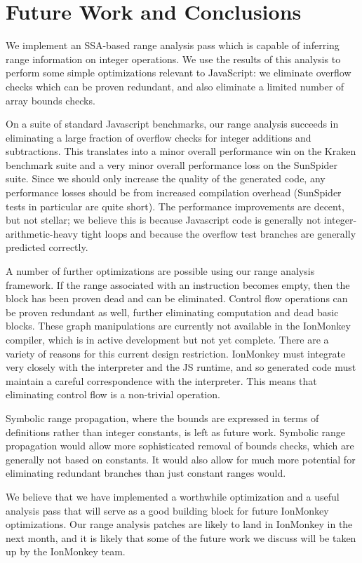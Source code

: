 \documentclass{article}
\begin{document}
\section{Future Work and Conclusions}
We implement an SSA-based range analysis pass which is capable of
inferring range information on integer operations. We use the results
of this analysis to perform some simple optimizations relevant to
JavaScript: we eliminate overflow checks which can be proven
redundant, and also eliminate a limited number of array bounds checks.

On a suite of standard Javascript benchmarks, our range analysis
succeeds in eliminating a large fraction of overflow checks for
integer additions and subtractions. This translates into a minor
overall performance win on the Kraken benchmark suite and a very minor
overall performance loss on the SunSpider suite. Since we should only
increase the quality of the generated code, any performance losses
should be from increased compilation overhead (SunSpider tests in
particular are quite short). The performance improvements are decent,
but not stellar; we believe this is because Javascript code is
generally not integer-arithmetic-heavy tight loops and because the
overflow test branches are generally predicted correctly.

A number of further optimizations are possible using our range analysis
framework. If the range associated with an instruction becomes empty, then the
block has been proven dead and can be eliminated. Control flow operations can
be proven redundant as well, further eliminating computation and dead basic
blocks. These graph manipulations are currently not available in the IonMonkey
compiler, which is in active development but not yet complete. There are a
variety of reasons for this current design restriction. IonMonkey must
integrate very closely with the interpreter and the JS runtime, and so
generated code must maintain a careful correspondence with the interpreter.
This means that eliminating control flow is a non-trivial
operation\cite{dvander}.

Symbolic range propagation, where the bounds are expressed in terms of
definitions rather than integer constants, is left as future
work. Symbolic range propagation would allow more sophisticated
removal of bounds checks, which are generally not based on
constants. It would also allow for much more potential for eliminating
redundant branches than just constant ranges would.

We believe that we have implemented a worthwhile optimization and a
useful analysis pass that will serve as a good building block for
future IonMonkey optimizations. Our range analysis patches are likely
to land in IonMonkey in the next month, and it is likely that some of
the future work we discuss will be taken up by the IonMonkey team.

{}

\end{document}
